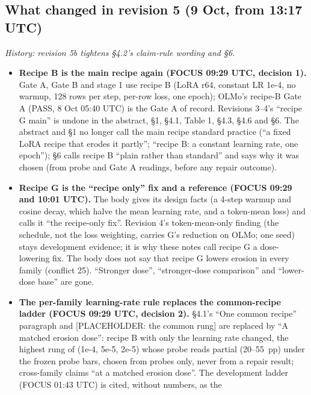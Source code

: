 \documentclass{article}
\theoremstyle{plain}
\theoremstyle{definition}
\theoremstyle{remark}
\begin{document}
\subsection{What changed in revision 5 (9 Oct, from 13:17 UTC)}

\emph{History: revision 5b tightens \S{}4.2's claim-rule wording and \S{}6.}

\begin{itemize}
  \item \textbf{Recipe B is the main recipe again (FOCUS 09:29 UTC, decision
        1).} Gate A, Gate B and stage 1 use recipe B (LoRA r64, constant LR
        1e-4, no warmup, 128 rows per step, per-row loss, one epoch); OLMo's
        recipe-B Gate A (PASS, 8 Oct 05:40 UTC) is the Gate A of record.
        Revisions 3--4's ``recipe G main'' is undone in the abstract, \S{}1,
        \S{}4.1, Table 1, \S{}4.3, \S{}4.6 and \S{}6. The abstract and \S{}1 no
        longer call the main recipe standard practice (``a fixed LoRA recipe
        that erodes it partly''; ``recipe B: a constant learning rate, one
        epoch''); \S{}6 calls recipe B ``plain rather than standard'' and says
        why it was chosen (from probe and Gate A readings, before any repair
        outcome).
  \item \textbf{Recipe G is the ``recipe only'' fix and a reference (FOCUS 09:29
        and 10:01 UTC).} The body gives its design facts (a 4-step warmup and
        cosine decay, which halve the mean learning rate, and a token-mean loss)
        and calls it ``the recipe-only fix''. Revision 4's token-mean-only
        finding (the schedule, not the loss weighting, carries G's reduction on
        OLMo; one seed) stays development evidence; it is why these notes call
        recipe G a dose-lowering fix. The body does not say that recipe G lowers
        erosion in every family (conflict 25). ``Stronger dose'',
        ``stronger-dose comparison'' and ``lower-dose base'' are gone.
  \item \textbf{The per-family learning-rate rule replaces the common-recipe
        ladder (FOCUS 09:29 UTC, decision 2).} \S{}4.1's ``One common recipe''
        paragraph and [PLACEHOLDER: the common rung] are replaced by ``A matched
        erosion dose'': recipe B with only the learning rate changed, the
        highest rung of (1e-4, 5e-5, 2e-5) whose probe reads partial (20--55~pp)
        under the frozen probe bars, chosen from probes only, never from a
        repair result; cross-family claims ``at a matched erosion dose''. The
        development ladder (FOCUS 01:43 UTC) is cited, without numbers, as the

\end{itemize}
\end{document}
